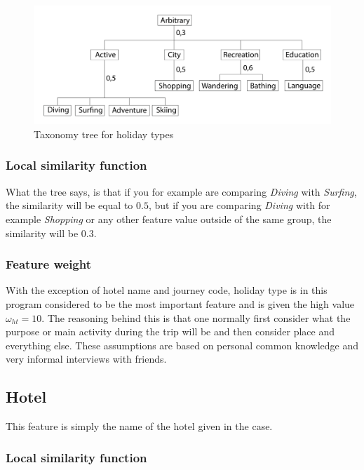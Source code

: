 \documentclass[12pt]{article}
\begin{document}
\begin{figure}[h]
\centering
\includegraphics[width=1\textwidth]{taxonomy-tree-ht.png}
\caption{\label{fig:taxonomy-tree-ht.png}Taxonomy tree for holiday types}
\end{figure}

\subsubsection{Local similarity function}
\label{sec:ht-sim}

What the tree says, is that if you for example are comparing \textit{Diving} with \textit{Surfing}, the similarity will be equal to $0.5$, but if you are comparing \textit{Diving} with for example \textit{Shopping} or any other feature value outside of the same group, the similarity will be $0.3$.

\subsubsection{Feature weight}
\label{sec:ht-weight}

With the exception of hotel name and journey code, holiday type is in this program considered to be the most important feature and is given the high value $\omega_{ht}=10$. The reasoning behind this is that one normally first consider what the purpose or main activity during the trip will be and then consider place and everything else. These assumptions are based on personal common knowledge and very informal interviews with friends. 

\subsection{Hotel}
\label{sec:hotel}

This feature is simply the name of the hotel given in the case. 

\subsubsection{Local similarity function}
\label{sec:hotel-sim}
\end{document}
